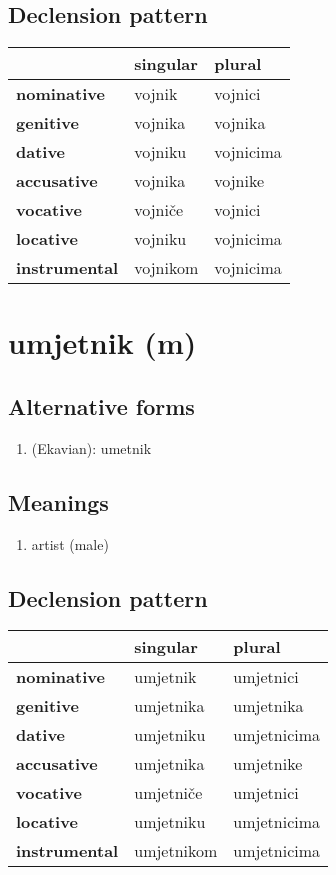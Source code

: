 \subsection*{Declension pattern}
\begin{tabularx}{\linewidth}{Xll}
\toprule
{} &  singular &     plural \\
\midrule
\textbf{nominative  } &    vojnik &    vojnici \\
\textbf{genitive    } &   vojnika &    vojnika \\
\textbf{dative      } &   vojniku &  vojnicima \\
\textbf{accusative  } &   vojnika &    vojnike \\
\textbf{vocative    } &   vojniče &    vojnici \\
\textbf{locative    } &   vojniku &  vojnicima \\
\textbf{instrumental} &  vojnikom &  vojnicima \\
\bottomrule
\end{tabularx}

\filbreak
\section{umjetnik (m)}
\subsection*{Alternative forms}
\begin{enumerate}
\item (Ekavian): umetnik
\end{enumerate}
\subsection*{Meanings}
\begin{enumerate}
\item artist (male)
\end{enumerate}
\subsection*{Declension pattern}
\begin{tabularx}{\linewidth}{Xll}
\toprule
{} &    singular &       plural \\
\midrule
\textbf{nominative  } &    umjetnik &    umjetnici \\
\textbf{genitive    } &   umjetnika &    umjetnika \\
\textbf{dative      } &   umjetniku &  umjetnicima \\
\textbf{accusative  } &   umjetnika &    umjetnike \\
\textbf{vocative    } &   umjetniče &    umjetnici \\
\textbf{locative    } &   umjetniku &  umjetnicima \\
\textbf{instrumental} &  umjetnikom &  umjetnicima \\
\bottomrule
\end{tabularx}

